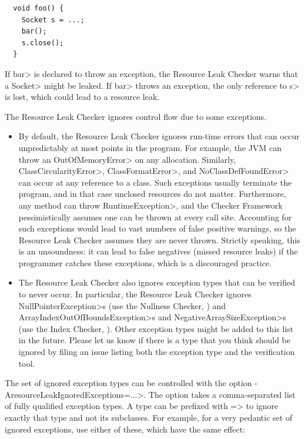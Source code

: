 \begin{verbatim}
  void foo() {
    Socket s = ...;
    bar();
    s.close();
  }
\end{verbatim}

If \<bar> is declared to throw an exception, the Resource Leak Checker
warns that a \<Socket> might be leaked.  If \<bar> throws an exception, the
only reference to \<s> is lost, which could lead to a resource leak.

The Resource Leak Checker ignores control flow due to some exceptions.

\begin{itemize}
\item
By default, the Resource Leak Checker ignores run-time errors that can occur
unpredictably at most points in the program. For example, the JVM can throw
an \<OutOfMemoryError> on any allocation.  Similarly,
\<ClassCircularityError>, \<ClassFormatError>, and \<NoClassDefFoundError>
can occur at any reference to a class.  Such exceptions usually terminate
the program, and in that case unclosed resources do not matter.
Furthermore, any method can throw \<RuntimeException>, and the Checker
Framework pessimistically assumes one can be thrown at every call site.
Accounting for such exceptions would lead to vast numbers of
false positive warnings, so the Resource Leak Checker assumes they are
never thrown.  Strictly speaking, this is an unsoundness:  it can lead to
false negatives (missed resource leaks) if the programmer catches these
exceptions, which is a discouraged practice.

\item
The Resource Leak Checker also ignores exception types that can be verified
to never occur.  In particular, the Resource Leak Checker ignores \<NullPointerException>s
(use the Nullness Checker, ) and
\<ArrayIndexOutOfBoundsException>s and \<NegativeArraySizeException>s (use the Index
Checker, ). Other exception types might be added to this
list in the future.  Please let us know if there is a type that you think should
be ignored by filing an issue listing both the exception type and the
verification tool.
\end{itemize}

The set of ignored exception types can be controlled with the option
\<-AresourceLeakIgnoredExceptions=...>.  The option takes a comma-separated list of
fully qualified exception types.  A type can be prefixed with \<=> to ignore exactly
that type and not its subclasses.  For example, for a very pedantic set of ignored
exceptions, use either of these, which have the same effect:

